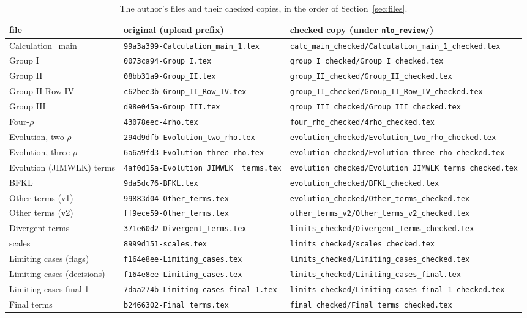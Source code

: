 \documentclass[10pt]{article}
\begin{document}
\begin{table}[h]
\centering\small
\begin{tabular}{@{}lll@{}}
\toprule
file & original (upload prefix) & checked copy (under \texttt{nlo\_review/})\\
\midrule
Calculation\_main & \texttt{99a3a399-Calculation\_main\_1.tex} & \texttt{calc\_main\_checked/Calculation\_main\_1\_checked.tex}\\
Group I & \texttt{0073ca94-Group\_I.tex} & \texttt{group\_I\_checked/Group\_I\_checked.tex}\\
Group II & \texttt{08bb31a9-Group\_II.tex} & \texttt{group\_II\_checked/Group\_II\_checked.tex}\\
Group II Row IV & \texttt{c62bee3b-Group\_II\_Row\_IV.tex} & \texttt{group\_II\_checked/Group\_II\_Row\_IV\_checked.tex}\\
Group III & \texttt{d98e045a-Group\_III.tex} & \texttt{group\_III\_checked/Group\_III\_checked.tex}\\
Four-$\rho$ & \texttt{43078eec-4rho.tex} & \texttt{four\_rho\_checked/4rho\_checked.tex}\\
Evolution, two $\rho$ & \texttt{294d9dfb-Evolution\_two\_rho.tex} & \texttt{evolution\_checked/Evolution\_two\_rho\_checked.tex}\\
Evolution, three $\rho$ & \texttt{6a6a9fd3-Evolution\_three\_rho.tex} & \texttt{evolution\_checked/Evolution\_three\_rho\_checked.tex}\\
Evolution (JIMWLK) terms & \texttt{4af0d15a-Evolution\_JIMWLK\_\_terms.tex} & \texttt{evolution\_checked/Evolution\_JIMWLK\_terms\_checked.tex}\\
BFKL & \texttt{9da5dc76-BFKL.tex} & \texttt{evolution\_checked/BFKL\_checked.tex}\\
Other terms (v1) & \texttt{99883d04-Other\_terms.tex} & \texttt{evolution\_checked/Other\_terms\_checked.tex}\\
Other terms (v2) & \texttt{ff9ece59-Other\_terms.tex} & \texttt{other\_terms\_v2/Other\_terms\_v2\_checked.tex}\\
Divergent terms & \texttt{371e60d2-Divergent\_terms.tex} & \texttt{limits\_checked/Divergent\_terms\_checked.tex}\\
scales & \texttt{8999d151-scales.tex} & \texttt{limits\_checked/scales\_checked.tex}\\
Limiting cases (flags) & \texttt{f164e8ee-Limiting\_cases.tex} & \texttt{limits\_checked/Limiting\_cases\_checked.tex}\\
Limiting cases (decisions) & \texttt{f164e8ee-Limiting\_cases.tex} & \texttt{limits\_checked/Limiting\_cases\_final.tex}\\
Limiting cases final 1 & \texttt{7daa274b-Limiting\_cases\_final\_1.tex} & \texttt{limits\_checked/Limiting\_cases\_final\_1\_checked.tex}\\
Final terms & \texttt{b2466302-Final\_terms.tex} & \texttt{final\_checked/Final\_terms\_checked.tex}\\
\bottomrule
\end{tabular}
\caption{The author's files and their checked copies, in the order of Section~\ref{sec:files}.}\label{tab:pairs}
\end{table}
\end{document}
